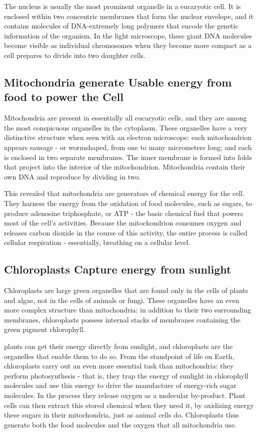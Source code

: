 The nucleus is usually the most prominent organelle in a eucaryotic cell. 
It is enclosed within two concentric membranes that form
the nuclear envelope, and it contains molecules of DNA-extremely long
polymers that encode the genetic information of the organism. In the
light microscope, these giant DNA molecules become visible as individual
chromosomes when they become more compact as a cell prepares to
divide into two daughter cells.

\subsection{Mitochondria generate Usable energy from food to power the Cell}

Mitochondria are present in essentially all eucaryotic cells, and they are
among the most conspicuous organelles in the cytoplasm.
These organelles have a very distinctive structure when seen with an
electron microscope: each mitochondrion appears sausage - or wormshaped, 
from one to many micrometers long; and each is enclosed in
two separate membranes. The inner membrane is formed into folds that
project into the interior of the mitochondrion. Mitochondria
contain their own DNA and reproduce by dividing in two.

This revealed that mitochondria are generators of
chemical energy for the cell. They harness the energy from the oxidation
of food molecules, such as sugars, to produce adenosine triphosphate,
or ATP - the basic chemical fuel that powers most of the cell’s activities.
Because the mitochondrion consumes oxygen and releases carbon
dioxide in the course of this activity, the entire process is called cellular
respiration - essentially, breathing on a cellular level.

\subsection{Chloroplasts Capture energy from sunlight}

Chloroplasts are large green organelles that are found only in the cells
of plants and algae, not in the cells of animals or fungi. These organelles
have an even more complex structure than mitochondria: in addition to
their two surrounding membranes, chloroplasts possess internal stacks
of membranes containing the green pigment chlorophyll.

plants can get their energy directly from sunlight, and chloroplasts are 
the organelles that enable them to do so.
From the standpoint of life on Earth, chloroplasts carry out an even more
essential task than mitochondria: they perform photosynthesis - that is,
they trap the energy of sunlight in chlorophyll molecules and use this
energy to drive the manufacture of energy-rich sugar molecules. In the
process they release oxygen as a molecular by-product. Plant cells can
then extract this stored chemical when they need it, by oxidizing
energy these sugars in their mitochondria, just as animal cells do. 
Chloroplasts thus generate both the food molecules and the oxygen that all 
mitochondria use.

